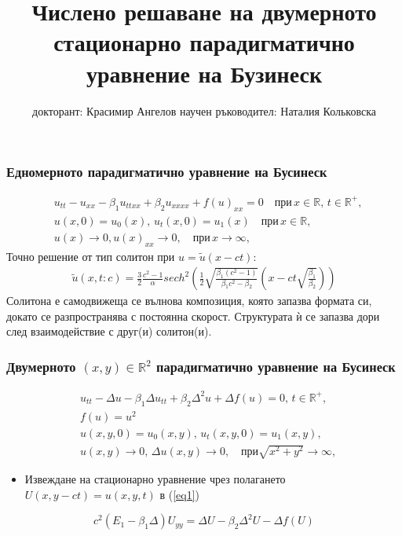 \documentclass{beamer}
\title{Числено решаване на двумерното стационарно парадигматично уравнение на Бузинеск}
\author{докторант: Красимир Ангелов 
\newline \newline научен ръководител: Наталия Кольковска}
\newcommand{\RR}{\mathbb{R}}
\newcommand{\rf}[1]{(\ref{#1})}
\begin{document}
\begin{frame}
\titlepage
\end{frame}


\begin{frame}
\frametitle{ Едномерното парадигматично уравнение на Бусинеск }
\begin{align}
&u_{tt} - u_{xx} -\beta_1  u_{ttxx} +\beta_2 u_{xxxx} + f(u)_{xx}=0   \quad \text{при} \,  x \in \RR, \, t\in\RR^+,\label{eq1D}
\\ \nonumber &u(x,0)=u_0(x), \, u_t(x,0)=u_1(x)   \quad\text{при} \, x \in \RR,
\\  &u(x) \rightarrow 0,  u(x)_{xx} \rightarrow 0 ,  \quad \text{при} \, x \rightarrow \infty, \label{eq1d1}
\end{align}
Точно решение от тип солитон при $u =\tilde u(x-ct)$:
\begin{align}
\tilde u(x,t:c) = \frac{3}{2} \frac{c^2-1}{\alpha}sech^2 \left( \frac{1}{2}  \sqrt{ \frac{\beta_1 (c^2-1)}{\beta_1 c^2-\beta_2}} (x-c t \sqrt{\frac{\beta_1}{\beta_2}} ) \right)
\end{align}
Солитона е самодвижеща се вълнова композиция, която запазва формата си, докато се разпространява с постоянна скорост. Структурата ѝ се запазва дори след взаимодействие с друг(и) солитон(и).
\end{frame}

\begin{frame}
\frametitle{ Двумерното $(x,y) \in \RR^2$ парадигматично уравнение на Бусинеск }
\begin{align}
&u_{tt} - \Delta u -\beta_1  \Delta u_{tt} +\beta_2 \Delta ^2 u + \Delta f(u)=0, \, t\in\RR^+,\label{eq1}
\\
&f(u) = u^2 \nonumber \\  \nonumber &u(x,y,0)=u_0(x,y), \, u_t(x,y,0)=u_1(x,y)  , 
\\  &u(x,y) \rightarrow 0, \,  \Delta u(x,y) \rightarrow 0 ,  \quad \text{при} \sqrt{x^2 + y^2} \rightarrow \infty, \label{eq11} 
\end{align}
\begin{itemize}
  \item Извеждане на {\color{red}стационарно} уравнение чрез полагането $U(x,y-ct)=u(x,y,t)$ в \rf{eq1}
\end{itemize}
\color{red}
\begin{equation}
c^2 (E_1-\beta_1 \Delta) U_{yy} = \Delta U -\beta_2 \Delta^2 U - \Delta f(U)
\end{equation}

\end{frame}
\end{document}
